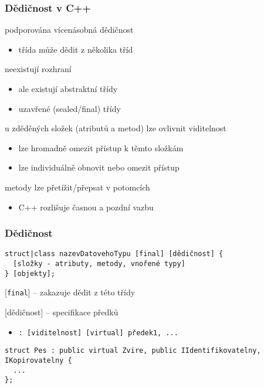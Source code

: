 
\begin{frame}[fragile]
\frametitle{Dědičnost v C++}

\begin{bitemize}
\item podporována vícenásobná dědičnost
\begin{itemize}
\item třída může dědit z několika tříd
\end{itemize}
\item neexistují rozhraní
\begin{itemize}
\item ale existují abstraktní třídy
\item uzavřené (sealed/final) třídy
\end{itemize}
\item u zděděných složek (atributů a metod) lze ovlivnit viditelnost
\begin{itemize}
\item lze hromadně omezit přístup k těmto složkám
\item lze individuálně obnovit nebo omezit přístup
\end{itemize}
\item metody lze přetížit/přepsat v potomcích
\begin{itemize}
\item C++ rozlišuje časnou a pozdní vazbu
\end{itemize}
\end{bitemize}
\end{frame}


\begin{frame}[fragile]
\frametitle{Dědičnost}
\begin{noteblock}{}
\begin{lstlisting}[basicstyle=\scriptsize]
struct|class nazevDatovehoTypu [final] [dědičnost] {
  [složky - atributy, metody, vnořené typy]
} [objekty];
\end{lstlisting}
\end{noteblock}

\begin{bitemize}
\item{} [\lstinline|final|] -- zakazuje dědit z této třídy
\item{} [dědičnost] -- specifikace předků
\begin{itemize}
\item \lstinline|: [viditelnost] [virtual] předek1, ...|
\end{itemize}
\end{bitemize}

\begin{yesblock}
\begin{lstlisting}
struct Pes : public virtual Zvire, public IIdentifikovatelny, IKopirovatelny {
  ...
};
\end{lstlisting}
\end{yesblock}
\end{frame}

